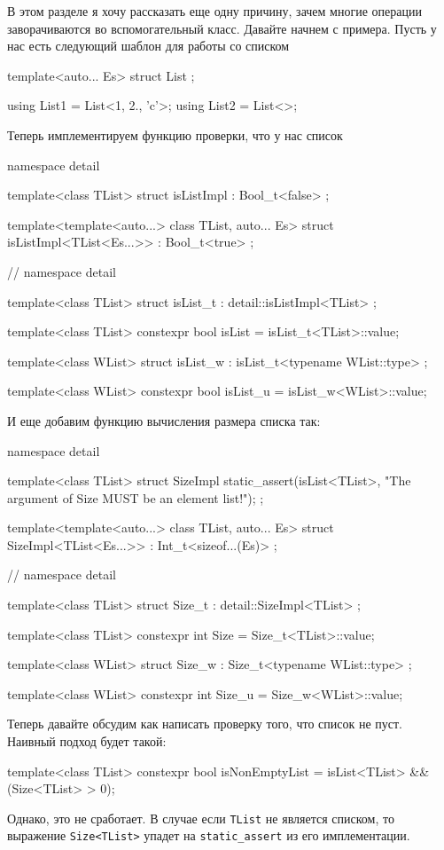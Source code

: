 В этом разделе я хочу рассказать еще одну причину, зачем многие операции заворачиваются во вспомогательный класс.
Давайте начнем с примера.
Пусть у нас есть следующий шаблон для работы со списком
\begin{cppcode}
template<auto... Es>
struct List {};

using List1 = List<1, 2., 'c'>;
using List2 = List<>;
\end{cppcode}
Теперь имплементируем функцию проверки, что у нас список
\begin{cppcode}
namespace detail {

template<class TList>
struct isListImpl : Bool_t<false> {};

template<template<auto...> class TList, auto... Es>
struct isListImpl<TList<Es...>> : Bool_t<true> {};
} // namespace detail

template<class TList>
struct isList_t : detail::isListImpl<TList> {};

template<class TList>
constexpr bool isList = isList_t<TList>::value;

template<class WList>
struct isList_w : isList_t<typename WList::type> {};

template<class WList>
constexpr bool isList_u = isList_w<WList>::value;
\end{cppcode}
И еще добавим функцию вычисления размера списка так:
\begin{cppcode}
namespace detail {
template<class TList>
struct SizeImpl {
  static_assert(isList<TList>, "The argument of Size MUST be an element list!");
};

template<template<auto...> class TList, auto... Es>
struct SizeImpl<TList<Es...>> : Int_t<sizeof...(Es)> {};
} // namespace detail

template<class TList>
struct Size_t : detail::SizeImpl<TList> {};

template<class TList>
constexpr int Size = Size_t<TList>::value;

template<class WList>
struct Size_w : Size_t<typename WList::type> {};

template<class WList>
constexpr int Size_u = Size_w<WList>::value;
\end{cppcode}
Теперь давайте обсудим как написать проверку того, что список не пуст.
Наивный подход будет такой:
\begin{cppcode}
template<class TList>
constexpr bool isNonEmptyList = isList<TList> && (Size<TList> > 0);
\end{cppcode}
Однако, это не сработает.
В случае если \verb"TList" не является списком, то выражение \verb"Size<TList>" упадет на \verb"static_assert" из его имплементации.
